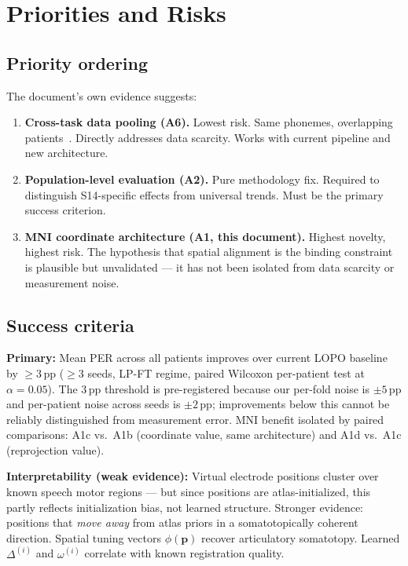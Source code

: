 \documentclass[11pt,letterpaper]{article}
\newcommand{\bfp}{\mathbf{p}}
\newcommand{\pp}{\,\text{pp}}
\begin{document}

\section{Priorities and Risks}\label{sec:priorities}

\subsection{Priority ordering}

The document's own evidence suggests:

\begin{enumerate}[leftmargin=2em]
\item \textbf{Cross-task data pooling (A6).} Lowest risk. Same phonemes, overlapping patients~\cite{duraivel2025}. Directly addresses data scarcity. Works with current pipeline and new architecture.

\item \textbf{Population-level evaluation (A2).} Pure methodology fix. Required to distinguish S14-specific effects from universal trends. Must be the primary success criterion.

\item \textbf{MNI coordinate architecture (A1, this document).} Highest novelty, highest risk. The hypothesis that spatial alignment is the binding constraint is plausible but unvalidated --- it has not been isolated from data scarcity or measurement noise.
\end{enumerate}

\subsection{Success criteria}

\textbf{Primary:} Mean PER across all patients improves over current LOPO baseline by $\geq 3\pp$ ($\geq 3$ seeds, LP-FT regime, paired Wilcoxon per-patient test at $\alpha{=}0.05$). The $3\pp$ threshold is pre-registered because our per-fold noise is $\pm 5\pp$ and per-patient noise across seeds is $\pm 2\pp$; improvements below this cannot be reliably distinguished from measurement error. MNI benefit isolated by paired comparisons: A1c vs.\ A1b (coordinate value, same architecture) and A1d vs.\ A1c (reprojection value).

\textbf{Interpretability (weak evidence):} Virtual electrode positions cluster over known speech motor regions --- but since positions are atlas-initialized, this partly reflects initialization bias, not learned structure. Stronger evidence: positions that \textit{move away} from atlas priors in a somatotopically coherent direction. Spatial tuning vectors $\phi(\bfp)$ recover articulatory somatotopy. Learned $\Delta^{(i)}$ and $\omega^{(i)}$ correlate with known registration quality.
\end{document}
